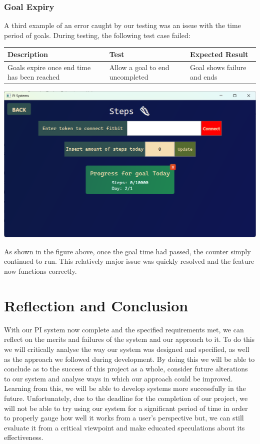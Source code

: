 \documentclass[12pt]{article}
\begin{document}
\subsubsection{Goal Expiry}
A third example of an error caught by our testing was an issue with the 
time period of goals. During testing, the following test case failed:\par
\begin{center}
    \begin{tabular}{|p{5cm}|p{5cm}|p{5cm}|}
        \hline
        \textbf{Description} & \textbf{Test} & \textbf{Expected Result}\\
        \hline
        Goals expire once end time has been reached 
        & Allow a goal to end uncompleted 
        & Goal shows failure and ends\\
        \hline
    \end{tabular}
\end{center}
\begin{center}
    \includegraphics[width=0.6\linewidth]{goalNotExpiring.png}
\end{center}
As shown in the figure above, once the goal time had passed, the counter 
simply continued to run. This relatively major issue was quickly resolved 
and the feature now functions correctly.\par


\section{Reflection and Conclusion}

With our PI system now complete and the specified requirements met, we can 
reflect on the merits and failures of the system and our approach to it. To do 
this we will critically analyse the way our system was designed and specified, 
as well as the approach we followed during development. By doing this we will 
be able to conclude as to the success of this project as a whole, consider 
future alterations to our system and analyse ways in which our approach could 
be improved. Learning from this, we will be able to develop systems more 
successfully in the future. Unfortunately, due to the deadline for the 
completion of our  project, we will not be able to try using our system for a 
significant period of time in order to properly gauge how well it works from 
a user's perspective but, we can still evaluate it from a critical viewpoint 
and make educated speculations about its effectiveness.\par
\end{document}
